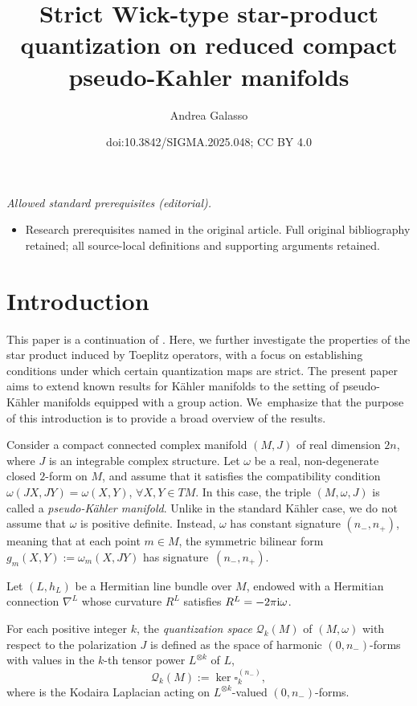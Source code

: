 \documentclass[10pt,a4paper]{amsart}
\title{Strict Wick-type star-product quantization on reduced compact pseudo-Kahler manifolds}
\author{Andrea Galasso}
\date{doi:10.3842/SIGMA.2025.048; CC BY 4.0}
\numberwithin{equation}{section}
\begin{document}
\maketitle
\noindent\textit{Allowed standard prerequisites (editorial).}\begin{itemize}
\item Research prerequisites named in the original article. Full original bibliography retained; all source-local definitions and supporting arguments retained.
\end{itemize}\medskip
\section{Introduction}
	
This paper is a continuation of \cite{gh}. Here, we further investigate the properties of the star product induced by Toeplitz operators, with a focus on establishing conditions under which certain quantization maps are strict. The present paper aims to extend known results for K\"ahler manifolds to the setting of pseudo-K\"ahler manifolds equipped with a group action. We~emphasize that the purpose of this introduction is to provide a broad overview of the results.
	
	 Consider a compact connected complex manifold $(M, J)$ of real dimension $2n$, where $J$ is an integrable complex structure. Let $\omega$ be a real, non-degenerate closed $2$-form on $M$, and assume that it satisfies the compatibility condition
		$
		\omega(JX, JY) = \omega(X, Y)$, $ \forall X,Y \in TM$.
		In this case, the triple $(M, \omega, J)$ is called a \emph{pseudo-K\"ahler manifold}. Unlike in the standard K\"ahler case, we do not assume that $\omega$ is positive definite. Instead, $\omega$ has constant signature $(n_-, n_+)$, meaning that at each point $m \in M$, the symmetric bilinear form $g_m(X,Y) := \omega_m(X, JY)$ has signature~${(n_-, n_+)}$.
		
		Let $(L, h_L)$ be a Hermitian line bundle over $M$, endowed with a Hermitian connection $\nabla^L$ whose curvature $R^L$ satisfies
		$
		R^L = -2\pi {\rm i} \omega$.
		

		\begin{Definition}
			For each positive integer $k$, the \emph{quantization space} $\mathcal{Q}_k(M)$ of $(M, \omega)$ with respect to the polarization $J$ is defined as the space of harmonic $(0,n_-)$-forms with values in the $k$-th tensor power $L^{\otimes k}$ of $L$,
\[
			\mathcal{Q}_k(M) := \ker \square^{(n_-)}_k,
\]
			where  is the Kodaira Laplacian acting on $L^{\otimes k}$-valued $(0,n_-)$-forms.
		\end{Definition}
		
\end{document}
